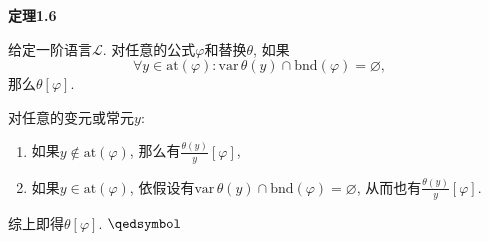 \documentclass[UTF8]{ctexart}
\begin{document}


\vspace{10pt}

\hypertarget{sec:定理1.6}{}
\noindent\textbf{定理1.6}

给定一阶语言$\mathcal{L}$. 对任意的公式$\varphi$和替换$\theta$, 如果
\[
    \forall y\in\mathrm{at}(\varphi):
    \mathrm{var}\,\theta(y)\cap\mathrm{bnd}(\varphi)=\varnothing,
\]
那么$\theta[\varphi]$.


对任意的变元或常元$y$:
\vspace{3pt}
\begin{enumerate}
    \item 如果$y\notin\mathrm{at}(\varphi)$,
    那么有$\displaystyle\frac{\theta(y)}{y}[\varphi]$,
    \item 如果$y\in\mathrm{at}(\varphi)$,
    依假设有$\mathrm{var}\,\theta(y)\cap\mathrm{bnd}(\varphi)=\varnothing$,
    从而也有$\displaystyle\frac{\theta(y)}{y}[\varphi]$.
\end{enumerate}

综上即得$\theta[\varphi]$. \hfill $\qedsymbol$
\end{document}
